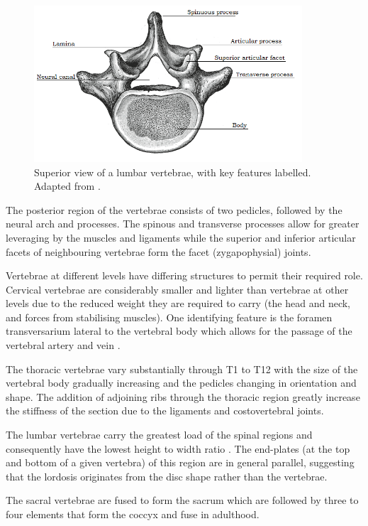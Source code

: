 \begin{figure}[hbt]
\centering

  \includegraphics[width=10cm]{images/vertebra.png}
  \caption{Superior view of a lumbar vertebrae, with key features labelled.
Adapted from \cite{Gray1918}.}
\label{fig:vertebra}
\end{figure}


The posterior region of the vertebrae consists of two pedicles, followed
by the neural arch and processes. The spinous and transverse processes
allow for greater leveraging by the muscles and ligaments while the
superior and inferior articular facets of neighbouring vertebrae form
the facet (zygapophysial) joints.

Vertebrae at different levels have differing structures to permit their
required role. Cervical vertebrae are considerably smaller and lighter
than vertebrae at other levels due to the reduced weight they are
required to carry (the head and neck, and forces from stabilising
muscles). One identifying feature is the foramen transversarium lateral
to the vertebral body which allows for the passage of the vertebral
artery and vein \cite{panjabi1991cervical}.

The thoracic vertebrae vary substantially through T1 to T12 with the
size of the vertebral body gradually increasing and the pedicles
changing in orientation and shape. The addition of adjoining ribs
through the thoracic region greatly increase the stiffness of the
section due to the ligaments and costovertebral joints.

The lumbar vertebrae carry the greatest load of the spinal regions
\cite{Stewart2006} and consequently have the lowest height to width ratio
\cite{Manohar1992}.
The end-plates (at the top and bottom of a given vertebra) of this region are in general parallel, suggesting that
the lordosis originates from the disc shape rather than the vertebrae.

The sacral vertebrae are fused to form the sacrum which are followed by
three to four elements that form the coccyx and fuse in adulthood.

